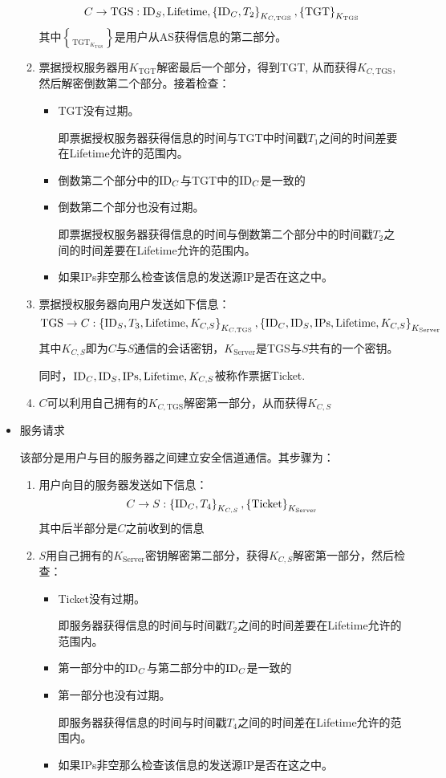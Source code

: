 \begin{itemize}
\begin{enumerate}
		\[C\to\mathrm{TGS}: \mathrm{ID}_{S}, \mathrm{Lifetime}, \left\{ {\mathrm{ID}_C, T_2} \right\}_{K_{C, \mathrm{TGS}}}, \left\{ {\mathrm{TGT}} \right\}_{K_{\mathrm{TGS}}}\]
		其中$\brace{\mathrm{TGT}}_{K_{\mathrm{TGS}}}$是用户从AS获得信息的第二部分。
		\item 票据授权服务器用$K_{\mathrm{TGT}}$解密最后一个部分，得到TGT, 从而获得$K_{C, \mathrm{TGS}}$, 然后解密倒数第二个部分。接着检查：
		\begin{itemize}
			\item TGT没有过期。\par
			即票据授权服务器获得信息的时间与TGT中时间戳$T_1$之间的时间差要在Lifetime允许的范围内。
			\item 倒数第二个部分中的$\mathrm{ID}_{C}$与TGT中的$\mathrm{ID}_C$是一致的
			\item 倒数第二个部分也没有过期。\par
			即票据授权服务器获得信息的时间与倒数第二个部分中的时间戳$T_2$之间的时间差要在Lifetime允许的范围内。
			\item 如果IPs非空那么检查该信息的发送源IP是否在这之中。
		\end{itemize}
		\item 票据授权服务器向用户发送如下信息：
		\[\mathrm{TGS}\to C: \left\{ {\mathrm{ID}_S, T_3, \mathrm{Lifetime}, K_{C, S}} \right\}_{K_{C, \mathrm{TGS}}}, \left\{ {\mathrm{ID}_C, \mathrm{ID}_S, \mathrm{IPs}, \mathrm{Lifetime}, K_{C, S}} \right\}_{K_{\mathrm{Server}}}\]
		其中$K_{C, S}$即为$C$与$S$通信的会话密钥，$K_{\mathrm{Server}}$是TGS与$S$共有的一个密钥。\par
		同时，$\mathrm{ID}_C, \mathrm{ID}_S, \mathrm{IPs}, \mathrm{Lifetime}, K_{C, S}$被称作票据Ticket.
		\item $C$可以利用自己拥有的$K_{C, \mathrm{TGS}}$解密第一部分，从而获得$K_{C, S}$
	\end{enumerate}
	\item 服务请求\par
	该部分是用户与目的服务器之间建立安全信道通信。其步骤为：
	\begin{enumerate}
		\item 用户向目的服务器发送如下信息：
		\[C\to S: \left\{ {\mathrm{ID}_C, T_4} \right\}_{K_{C, S}}, \left\{ {\mathrm{Ticket}} \right\}_{K_{\mathrm{Server}}}\]
		其中后半部分是$C$之前收到的信息
		\item $S$用自己拥有的$K_{\mathrm{Server}}$密钥解密第二部分，获得$K_{C, S}$解密第一部分，然后检查：
		\begin{itemize}
			\item Ticket没有过期。\par
			即服务器获得信息的时间与时间戳$T_2$之间的时间差要在Lifetime允许的范围内。
			\item 第一部分中的$\mathrm{ID}_C$与第二部分中的$\mathrm{ID}_C$是一致的
			\item 第一部分也没有过期。\par
			即服务器获得信息的时间与时间戳$T_4$之间的时间差在Lifetime允许的范围内。
			\item 如果IPs非空那么检查该信息的发送源IP是否在这之中。
		\end{itemize}
	\end{enumerate}	
\end{itemize}

